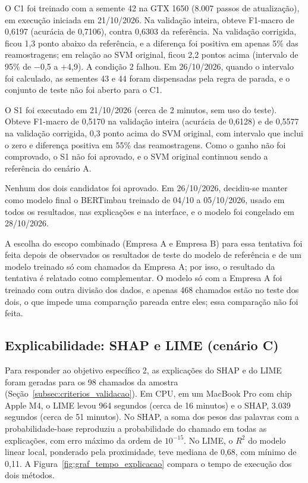 \documentclass[
    12pt,                %
    openright,           %
    oneside,             %
    a4paper,             %
    english,             %
    brazil               %
]{abntex2}
\begin{document}
O C1 foi treinado com a semente 42 na GTX 1650 (8.007 passos de atualização), em execução iniciada em 21/10/2026. Na validação inteira, obteve F1-macro de 0,6197 (acurácia de 0,7106), contra 0,6303 da referência. Na validação corrigida, ficou 1,3 ponto abaixo da referência, e a diferença foi positiva em apenas 5\% das reamostragens; em relação ao SVM original, ficou 2,2 pontos acima (intervalo de 95\% de $-$0,5 a $+$4,9). A condição 2 falhou. Em 26/10/2026, quando o intervalo foi calculado, as sementes 43 e 44 foram dispensadas pela regra de parada, e o conjunto de teste não foi aberto para o C1.

O S1 foi executado em 21/10/2026 (cerca de 2 minutos, sem uso do teste). Obteve F1-macro de 0,5170 na validação inteira (acurácia de 0,6128) e de 0,5577 na validação corrigida, 0,3 ponto acima do SVM original, com intervalo que inclui o zero e diferença positiva em 55\% das reamostragens. Como o ganho não foi comprovado, o S1 não foi aprovado, e o SVM original continuou sendo a referência do cenário A.

Nenhum dos dois candidatos foi aprovado. Em 26/10/2026, decidiu-se manter como modelo final o BERTimbau treinado de 04/10 a 05/10/2026, usado em todos os resultados, nas explicações e na interface, e o modelo foi congelado em 28/10/2026.

A escolha do escopo combinado (Empresa A e Empresa B) para essa tentativa foi feita depois de observados os resultados de teste do modelo de referência e de um modelo treinado só com chamados da Empresa A; por isso, o resultado da tentativa é relatado como complementar. O modelo só com a Empresa A foi treinado com outra divisão dos dados, e apenas 468 chamados estão no teste dos dois, o que impede uma comparação pareada entre eles; essa comparação não foi feita.

\subsection{Explicabilidade: SHAP e LIME (cenário C)}
\label{subsec:res_xai}
Para responder ao objetivo específico 2, as explicações do SHAP e do LIME foram geradas para os 98 chamados da amostra (Seção~\ref{subsec:criterios_validacao}). Em CPU, em um MacBook Pro com chip Apple M4, o LIME levou 964 segundos (cerca de 16 minutos) e o SHAP, 3.039 segundos (cerca de 51 minutos). No SHAP, a soma dos pesos das palavras com a probabilidade-base reproduziu a probabilidade do chamado em todas as explicações, com erro máximo da ordem de $10^{-15}$. No LIME, o $R^2$ do modelo linear local, ponderado pela proximidade, teve mediana de 0,68, com mínimo de 0,11. A Figura~\ref{fig:graf_tempo_explicacao} compara o tempo de execução dos dois métodos.
\end{document}
